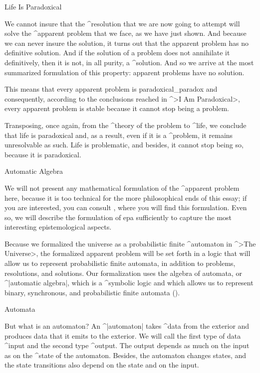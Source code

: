 \Section Life Is Paradoxical

We cannot insure that the ^{resolution} that we are now going to attempt
will solve the ^{apparent problem} that we face, as we have just shown.
And because we can never insure the solution, it turns out that the
apparent problem has no definitive solution. And if the solution of a
problem does not annihilate it definitively, then it is not, in all
purity, a ^{solution}. And so we arrive at the most summarized
formulation of this property: apparent problems have no solution.

This means that every apparent problem is paradoxical_{paradox} and
consequently, according to the conclusions reached in ^>I Am
Paradoxical>, every apparent problem is stable because it cannot stop
being a problem.

Transposing, once again, from the ^{theory of the problem} to ^{life},
we conclude that life is paradoxical and, as a result, even if it is a
^{problem}, it remains unresolvable as such. Life is problematic, and
besides, it cannot stop being so, because it is paradoxical.


\Section Automatic Algebra

We will not present any mathematical formulation of the ^{apparent
problem} here, because it is too technical for the more philosophical
ends of this essay; if you are interested, you can consult
, where you will find this formulation. Even so, we will
describe the formulation of {\sc epa} sufficiently to capture the most
interesting epistemological aspects.

Because we formalized the universe as a probabilistic finite
^{automaton} in ^>The Universe>, the formalized apparent problem will be
set forth in a logic that will allow us to represent probabilistic
finite automata, in addition to problems, resolutions, and solutions.
Our formalization uses the algebra of automata, or ^|automatic algebra|,
which is a ^{symbolic logic} and which allows us to represent binary,
synchronous, and probabilistic finite automata ().


\Section Automata

But what is an automaton? An ^|automaton| takes ^{data} from the
exterior and produces data that it emits to the exterior. We will call
the first type of data ^{input} and the second type ^{output}. The
output depends as much on the input as on the ^{state} of the automaton.
Besides, the automaton changes states, and the state transitions also
depend on the state and on the input.

